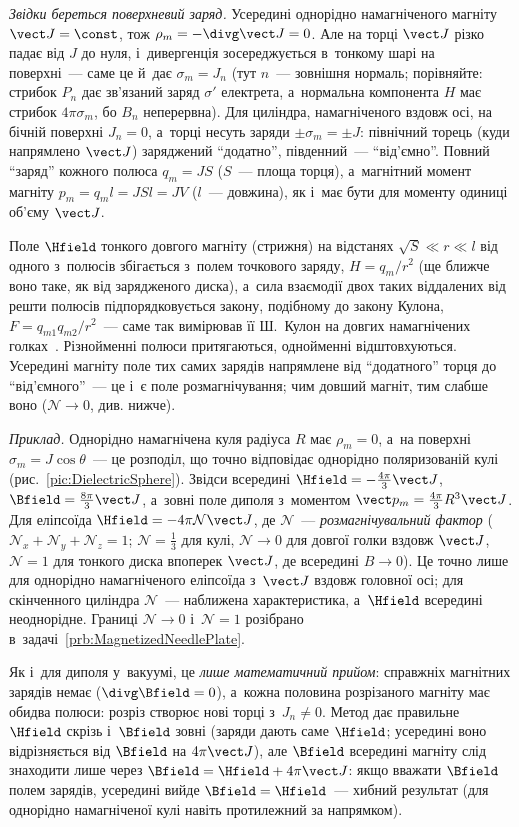 \begin{Extra}
\emph{Звідки береться поверхневий заряд.} Усередині однорідно намагніченого магніту $\vect J=\const$, тож $\rho_m=-\divg\vect J=0$. Але на торці $\vect J$ різко падає від $J$ до нуля, і~дивергенція зосереджується в~тонкому шарі на поверхні~--- саме це й~дає $\sigma_m=J_n$ (тут $n$~--- зовнішня нормаль; порівняйте: стрибок $P_n$ дає зв'язаний заряд $\sigma'$ електрета, а~нормальна компонента $H$ має стрибок $4\pi\sigma_m$, бо $B_n$ неперервна). Для циліндра, намагніченого вздовж осі, на бічній поверхні $J_n=0$, а~торці несуть заряди $\pm\sigma_m=\pm J$: північний торець (куди напрямлено $\vect J$) заряджений \enquote{додатно}, південний~--- \enquote{від'ємно}. Повний \enquote{заряд} кожного полюса $q_m=JS$ ($S$~--- площа торця), а~магнітний момент магніту $p_m=q_m l=JSl=JV$ ($l$~--- довжина), як і~має бути для моменту одиниці об'єму $\vect J$.

Поле $\Hfield$ тонкого довгого магніту (стрижня) на відстанях $\sqrt S\ll r\ll l$ від одного з~полюсів збігається з~полем точкового заряду, $H=q_m/r^2$ (ще ближче воно таке, як від зарядженого диска), а~сила взаємодії двох таких віддалених від решти полюсів підпорядковується закону, подібному до закону Кулона, $F=q_{m1}q_{m2}/r^2$~--- саме так вимірював її Ш.~Кулон на довгих намагнічених голках~\cite{Coulomb1785}. Різнойменні полюси притягаються, однойменні відштовхуються. Усередині магніту поле тих самих зарядів напрямлене від \enquote{додатного} торця до \enquote{від'ємного}~--- це і~є поле розмагнічування; чим довший магніт, тим слабше воно ($\mathcal N\to0$, див. нижче).

\emph{Приклад.} Однорідно намагнічена куля радіуса $R$ має $\rho_m=0$, а~на поверхні $\sigma_m=J\cos\theta$~--- це розподіл, що точно відповідає однорідно поляризованій кулі (рис.~\ref{pic:DielectricSphere}).
Звідси всередині $\Hfield=-\tfrac{4\pi}{3}\vect J$, $\Bfield=\tfrac{8\pi}{3}\vect J$, а~зовні поле диполя з~моментом $\vect p_m=\tfrac{4\pi}{3}R^3\vect J$.
Для еліпсоїда $\Hfield=-4\pi \mathcal N\vect J$, де $\mathcal N$~--- \emph{розмагнічувальний фактор} ($\mathcal N_x+\mathcal N_y+\mathcal N_z=1$; $\mathcal N=\tfrac13$ для кулі, $\mathcal N\to0$ для довгої голки вздовж $\vect J$, $\mathcal N=1$ для тонкого диска впоперек $\vect J$, де всередині $B\to0$). Це точно лише для однорідно намагніченого еліпсоїда з~$\vect J$ вздовж головної осі; для скінченного циліндра $\mathcal N$~--- наближена характеристика, а~$\Hfield$ всередині неоднорідне. Границі $\mathcal N\to0$ і~$\mathcal N=1$ розібрано в~задачі~\ref{prb:MagnetizedNeedlePlate}.

Як і~для диполя у~вакуумі, це \emph{лише математичний прийом}: справжніх магнітних зарядів немає ($\divg\Bfield=0$), а~кожна половина розрізаного магніту має обидва полюси: розріз створює нові торці з~$J_n\ne0$.
Метод дає правильне $\Hfield$ скрізь і~$\Bfield$ зовні (заряди дають саме $\Hfield$; усередині воно відрізняється від $\Bfield$ на $4\pi\vect J$), але $\Bfield$ всередині магніту слід знаходити лише через $\Bfield=\Hfield+4\pi\vect J$: якщо вважати $\Bfield$ полем зарядів, усередині вийде $\Bfield=\Hfield$~--- хибний результат (для однорідно намагніченої кулі навіть протилежний за напрямком).
\end{Extra}

